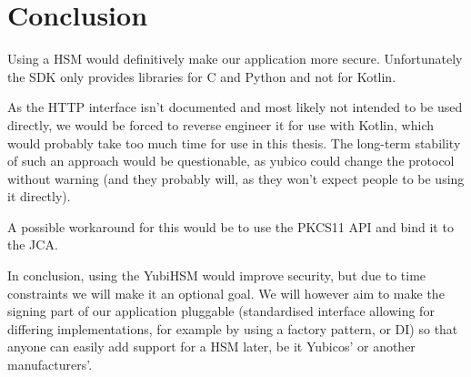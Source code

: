 \section{Conclusion}\label{sec:conclusion}
Using a \gls{HSM} would definitively make our application more secure.
Unfortunately the \gls{SDK} only provides libraries for C and Python and not for Kotlin.

As the \gls{HTTP} interface isn't documented and most likely not intended to be used directly,
we would be forced to reverse engineer it for use with Kotlin,
which would probably take too much time for use in this thesis.
The long-term stability of such an approach would be questionable,
as yubico could change the protocol without warning (and they probably will, as they won't expect people to be using it directly).

A possible workaround for this would be to use the \gls{PKCS11} \gls{API} and bind it to the \gls{JCA}.

In conclusion, using the YubiHSM would improve security, but due to time constraints we will make it an optional goal.
We will however aim to make the signing part of our application pluggable (standardised interface allowing for differing implementations,
for example by using a factory pattern, or \gls{DI}) so that anyone can easily add support for a \gls{HSM} later,
be it Yubicos' or another manufacturers'.
